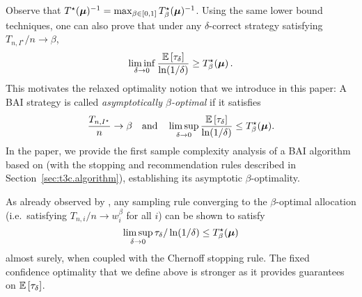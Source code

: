 Observe that $T^\star({\boldsymbol \mu})^{-1} = \max_{\beta \in [0,1]} T_{\beta}^\star({\boldsymbol \mu})^{-1}$. Using the same lower bound techniques, one can also prove that under any $\delta$-correct strategy satisfying $T_{n,I^\star}/n \rightarrow \beta$,
\[
    \liminf_{\delta \rightarrow 0}\frac{\mathbb{E}\left[\tau_\delta\right]}{\ln(1/\delta)} \geq T_{\beta}^\star({\boldsymbol \mu})\,.
\]
This motivates the relaxed optimality notion that we introduce in this paper: A BAI strategy is called \emph{asymptotically $\beta$-optimal} if it satisfies 
\[\frac{T_{n,I^\star}}{n}\rightarrow \beta \ \ \ \text{and} \ \ \ \limsup_{\delta \rightarrow 0}\frac{\EE{\tau_\delta}}{\ln(1/\delta)} \leq T_{\beta}^\star(\bmu).\]
In the paper, we provide the first sample complexity analysis of a BAI algorithm based on \TTTS (with the stopping and recommendation rules described in Section~\ref{sec:t3c.algorithm}), establishing its asymptotic $\beta$-optimality.

As already observed by \cite{qin2017ttei}, any sampling rule converging to the $\beta$-optimal allocation (i.e.\ satisfying $T_{n,i}/n \rightarrow w_i^\beta$ for all $i$) can be shown to satisfy 
\[
    \limsup_{\delta \rightarrow 0} \tau_\delta/\ln(1/\delta) \leq T_{\beta}^\star({\boldsymbol \mu})
\]
almost surely, when coupled with the Chernoff stopping rule. The fixed confidence optimality that we define above is stronger as it provides guarantees on $\mathbb{E}\left[\tau_\delta\right]$.

